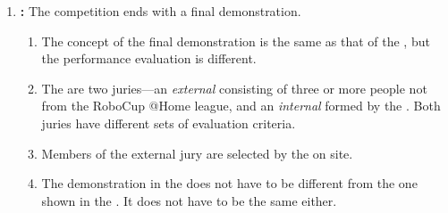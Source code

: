 \begin{enumerate}
	\item \textbf{:} The competition ends with a final demonstration.
	\begin{enumerate}
		\item The concept of the final demonstration is the same as that of the , but the performance evaluation is different.
		\item The are two juries---an \emph{external} consisting of three or more people not from the RoboCup @Home league, and an \emph{internal} formed by the . Both juries have different sets of evaluation criteria.
		\item Members of the external jury are selected by the  on site.
		\item The demonstration in the  does not have to be different from the one shown in the . It does not have to be the same either.
	\end{enumerate}
\end{enumerate}


